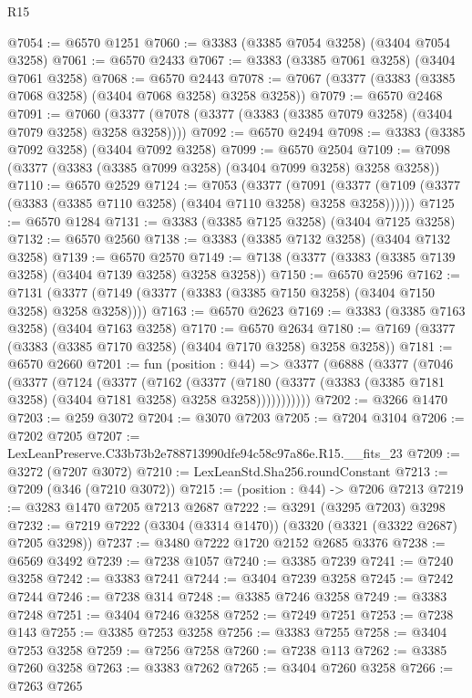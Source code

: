 \begin{lexlean}{R15}
\begin{coremodule}
@7054 := @6570 @1251
@7060 := @3383 (@3385 @7054 @3258) (@3404 @7054 @3258)
@7061 := @6570 @2433
@7067 := @3383 (@3385 @7061 @3258) (@3404 @7061 @3258)
@7068 := @6570 @2443
@7078 := @7067 (@3377 (@3383 (@3385 @7068 @3258) (@3404 @7068 @3258) @3258 @3258))
@7079 := @6570 @2468
@7091 := @7060 (@3377 (@7078 (@3377 (@3383 (@3385 @7079 @3258) (@3404 @7079 @3258) @3258 @3258))))
@7092 := @6570 @2494
@7098 := @3383 (@3385 @7092 @3258) (@3404 @7092 @3258)
@7099 := @6570 @2504
@7109 := @7098 (@3377 (@3383 (@3385 @7099 @3258) (@3404 @7099 @3258) @3258 @3258))
@7110 := @6570 @2529
@7124 := @7053
    (@3377
      (@7091 (@3377 (@7109 (@3377 (@3383 (@3385 @7110 @3258) (@3404 @7110 @3258) @3258 @3258))))))
@7125 := @6570 @1284
@7131 := @3383 (@3385 @7125 @3258) (@3404 @7125 @3258)
@7132 := @6570 @2560
@7138 := @3383 (@3385 @7132 @3258) (@3404 @7132 @3258)
@7139 := @6570 @2570
@7149 := @7138 (@3377 (@3383 (@3385 @7139 @3258) (@3404 @7139 @3258) @3258 @3258))
@7150 := @6570 @2596
@7162 := @7131 (@3377 (@7149 (@3377 (@3383 (@3385 @7150 @3258) (@3404 @7150 @3258) @3258 @3258))))
@7163 := @6570 @2623
@7169 := @3383 (@3385 @7163 @3258) (@3404 @7163 @3258)
@7170 := @6570 @2634
@7180 := @7169 (@3377 (@3383 (@3385 @7170 @3258) (@3404 @7170 @3258) @3258 @3258))
@7181 := @6570 @2660
@7201 := fun (position : @44) =>
  @3377
    (@6888
      (@3377
        (@7046
          (@3377
            (@7124
              (@3377
                (@7162
                  (@3377
                    (@7180
                      (@3377 (@3383 (@3385 @7181 @3258) (@3404 @7181 @3258) @3258 @3258)))))))))))
@7202 := @3266 @1470
@7203 := @259 @3072
@7204 := @3070 @7203
@7205 := @7204 @3104
@7206 := @7202 @7205
@7207 := LexLeanPreserve.C33b73b2e788713990dfe94c58c97a86e.R15.__fits_23
@7209 := @3272 (@7207 @3072)
@7210 := LexLeanStd.Sha256.roundConstant
@7213 := @7209 (@346 (@7210 @3072))
@7215 := (position : @44) -> @7206 @7213
@7219 := @3283 @1470 @7205 @7213 @2687
@7222 := @3291 (@3295 @7203) @3298
@7232 := @7219 @7222 (@3304 (@3314 @1470)) (@3320 (@3321 (@3322 @2687) @7205 @3298))
@7237 := @3480 @7222 @1720 @2152 @2685 @3376
@7238 := @6569 @3492
@7239 := @7238 @1057
@7240 := @3385 @7239
@7241 := @7240 @3258
@7242 := @3383 @7241
@7244 := @3404 @7239 @3258
@7245 := @7242 @7244
@7246 := @7238 @314
@7248 := @3385 @7246 @3258
@7249 := @3383 @7248
@7251 := @3404 @7246 @3258
@7252 := @7249 @7251
@7253 := @7238 @143
@7255 := @3385 @7253 @3258
@7256 := @3383 @7255
@7258 := @3404 @7253 @3258
@7259 := @7256 @7258
@7260 := @7238 @113
@7262 := @3385 @7260 @3258
@7263 := @3383 @7262
@7265 := @3404 @7260 @3258
@7266 := @7263 @7265

\end{coremodule}
\end{lexlean}
